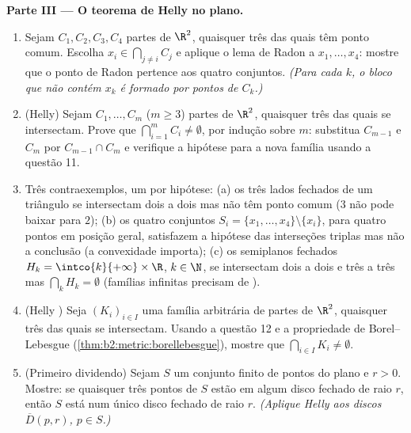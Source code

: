 \begin{problem}
\medskip
\noindent\textbf{Parte III --- O teorema de Helly no plano.}
\begin{enumerate}[resume]
  \item Sejam $C_1, C_2, C_3, C_4$ partes  de $\R^2$,
        quaisquer três das quais têm ponto comum. Escolha $x_i \in
        \bigcap_{j \neq i} C_j$ e aplique o lema de Radon a
        $x_1, \dots, x_4$: mostre que o ponto de Radon pertence
        aos quatro conjuntos. \emph{(Para cada $k$, o bloco que não
        contém $x_k$ é formado por pontos de $C_k$.)}
  \item (Helly) Sejam $C_1, \dots, C_m$ ($m \geq 3$) partes 
        de $\R^2$, quaisquer três das quais se intersectam.
        Prove que $\bigcap_{i=1}^m C_i \neq \emptyset$, por
        indução sobre $m$: substitua $C_{m-1}$ e $C_m$ por
        $C_{m-1} \cap C_m$ e verifique a hipótese para a
        nova família usando a questão 11.
  \item Três contraexemplos, um por hipótese: (a) os
        três lados fechados de um triângulo se intersectam dois a dois
        mas não têm ponto comum ($3$ não pode baixar para
        $2$); (b) os quatro conjuntos $S_i = \{x_1, \dots, x_4\}
        \setminus \{x_i\}$, para quatro pontos em posição geral,
        satisfazem a hipótese das interseções triplas
        mas não a conclusão (a convexidade importa); (c) os
        semiplanos fechados $H_k = \intco{k}{+\infty} \times
        \R$, $k \in \N$, se intersectam dois a dois e três a três
        mas $\bigcap_k H_k = \emptyset$ (famílias infinitas
        precisam de ).
  \item (Helly ) Seja $(K_i)_{i \in I}$ uma família arbitrária
        de partes   de $\R^2$, quaisquer três
        das quais se intersectam. Usando a questão 12 e a
        propriedade de Borel--Lebesgue
        (\cref{thm:b2:metric:borellebesgue}), mostre que
        $\bigcap_{i \in I} K_i \neq \emptyset$.
  \item (Primeiro dividendo) Sejam $S$ um conjunto finito de pontos do
        plano e $r > 0$. Mostre: se quaisquer três pontos de
        $S$ estão em algum disco fechado de raio $r$, então $S$
        está num único disco fechado de raio $r$. \emph{(Aplique
        Helly aos discos $\overline D(p, r)$, $p \in S$.)}
\end{enumerate}


\end{problem}
